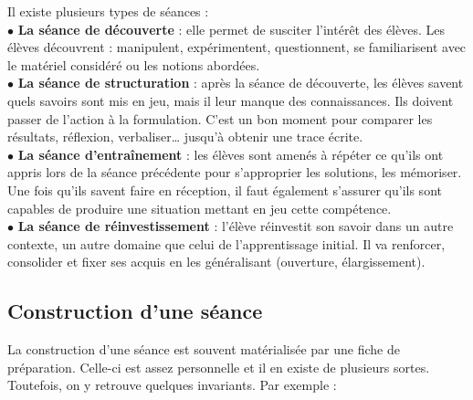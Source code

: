 Il existe plusieurs types de séances : \\
$\bullet$ {\bf La séance de découverte} : elle permet de susciter l'intérêt des élèves. Les élèves découvrent : manipulent, expérimentent, questionnent, se familiarisent avec le matériel considéré ou les notions abordées. \\
$\bullet$ {\bf La séance de structuration} : après la séance de découverte, les élèves savent quels savoirs sont mis en jeu, mais il leur manque des connaissances. Ils doivent passer de l’action à la formulation. C’est un bon moment pour comparer les résultats, réflexion, verbaliser\dots{} jusqu'à obtenir une trace écrite. \\
$\bullet$ {\bf La séance d'entraînement} : les élèves sont amenés à répéter ce qu'ils ont appris lors de la séance précédente pour s’approprier les solutions, les mémoriser.
Une fois qu’ils savent faire en réception, il faut également s’assurer qu’ils sont capables de produire une situation mettant en jeu cette compétence. \\
$\bullet$ {\bf La séance de réinvestissement} : l’élève réinvestit son savoir dans un autre contexte, un autre domaine que celui de l’apprentissage initial. Il va renforcer, consolider et fixer ses acquis en les généralisant (ouverture, élargissement).


\subsection{Construction d'une séance} %

La construction d'une séance est souvent matérialisée par une fiche de préparation. Celle-ci est assez personnelle et il en existe de plusieurs sortes. Toutefois, on y retrouve quelques invariants. Par exemple : \\

